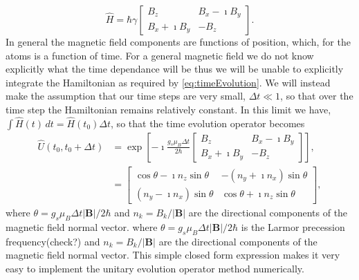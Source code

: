 \begin{equation*}
    \widehat{H} = \hbar\gamma \begin{bmatrix} B_z & B_x - \imath B_y \\
                                                      B_x + \imath B_y & -B_z \end{bmatrix}.                                         
\end{equation*}
In general the magnetic field components are functions of position, which, for the atoms is a function of time.
For a general magnetic field we do not know explicitly what the time dependance will be thus we will be unable to explicitly integrate the Hamiltonian as required by \autoref{eq:timeEvolution}.
We will instead make the assumption that our time steps are very small, $\Delta t \ll 1$, so that over the time step the Hamiltonian remains relatively constant.
In this limit we have, $\int\widehat{H}(t)\,dt = \widehat{H}(t_0)\Delta t$, so that the time evolution operator becomes
\begin{align}
    \widehat{U}(t_0,t_0+\Delta t) &= \exp\left[  -\imath\frac{g_s\mu_B\Delta t}{2 \hbar} \begin{bmatrix} B_z & B_x - \imath B_y \\
                                                      B_x + \imath B_y & -B_z \end{bmatrix} \right],\\
                &= \begin{bmatrix} \cos\theta - \imath n_z \sin\theta & -\left(n_y+\imath n_x\right)\sin\theta \\
                                   \left(n_y-\imath n_x\right)\sin\theta & \cos\theta + \imath n_z \sin\theta\end{bmatrix}, 
\end{align}
where $\theta = g_s \mu_B \Delta t \vert \mathbf{B} \vert / 2\hbar$ and $n_k = B_k / \vert \mathbf{B} \vert$ are the directional components of the magnetic field normal vector.
where $\theta = g_s \mu_B \Delta t \vert \mathbf{B} \vert / 2\hbar$ is the Larmor precession frequency(check?) and $n_k = B_k / \vert \mathbf{B} \vert$ are the directional components of the magnetic field normal vector.
This simple closed form expression makes it very easy to implement the unitary evolution operator method numerically.

